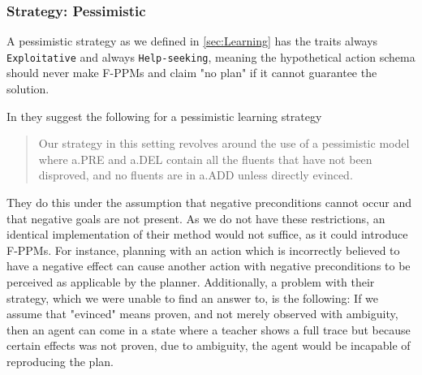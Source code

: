 \documentclass[../Master.tex]{subfiles}
\begin{document}
\subsubsection{Strategy: Pessimistic}

	A pessimistic strategy as we defined in \ref{sec:Learning} has the traits always \texttt{Exploitative} and always \texttt{Help-seeking},
	meaning the hypothetical action schema should never make F-PPMs and claim "no plan" if it cannot guarantee the solution.

	In \cite{Walsh2008} they suggest the following for a pessimistic learning strategy
	
	\begin{quotation}
		Our strategy in
		this setting revolves around the use of a pessimistic model
		where a.PRE and a.DEL contain all the fluents that have
		not been disproved, and no fluents are in a.ADD unless directly
		evinced.
	\end{quotation}
	 
	They do this under the assumption that negative preconditions cannot occur and that negative goals are not present. As we do not have these restrictions, an identical implementation of their method would not suffice, as it could introduce F-PPMs. For instance, planning with an action which is incorrectly believed to have a negative effect can cause another action with negative preconditions to be perceived as applicable by the planner.
	Additionally, a problem with their strategy, which we were unable to find an answer to, is the following: If we assume that "evinced" means proven, and not merely observed with ambiguity, then an agent can come in a state where a teacher shows a full trace but because certain effects was not proven, due to ambiguity, the agent would be incapable of reproducing the plan.
	
\end{document}
